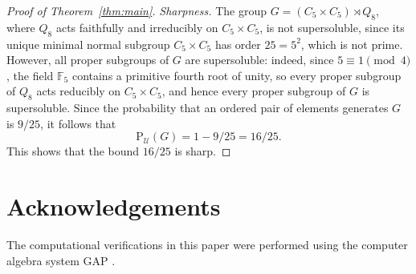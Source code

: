 \documentclass{amsart}
\newcommand{\Psu}{\mathrm{P}_{\mathcal{U}}}
\begin{document}
\begin{proof}[Proof of Theorem~\ref{thm:main}]
		\medskip
		\noindent\textit{Sharpness.}
The group $G = (C_5 \times C_5) \rtimes Q_8$, where $Q_8$ 
acts faithfully and irreducibly on $C_5 \times C_5$, is not 
supersoluble, since its unique minimal normal subgroup 
$C_5 \times C_5$ has order $25 = 5^2$, which is not prime. 
However, all proper subgroups of $G$ are supersoluble: indeed, 
since $5 \equiv 1 \pmod{4}$, the field $\mathbb{F}_5$ contains 
a primitive fourth root of unity, so every proper subgroup of 
$Q_8$ acts reducibly on $C_5 \times C_5$, and hence every 
proper subgroup of $G$ is supersoluble.
Since the probability that an ordered pair of elements 
generates $G$ is $9/25$, it follows that
$$\Psu(G) = 1 - 9/25 = 16/25.$$
This shows that the bound $16/25$ is sharp.
	\end{proof}
	
	\section*{Acknowledgements}
	The computational verifications in this paper were performed 
	using the computer algebra system GAP \cite{GAP}.
	
\end{document}
